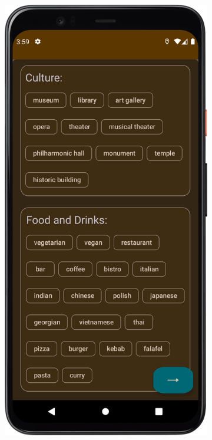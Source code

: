         \begin{figure}[H]%
            \centering
            \begin{subfigure}[b]{0.38\textwidth}
                \centering
                \includegraphics[width=\textwidth]{src/app/tags_unselected.png}

\end{subfigure}
\end{figure}
